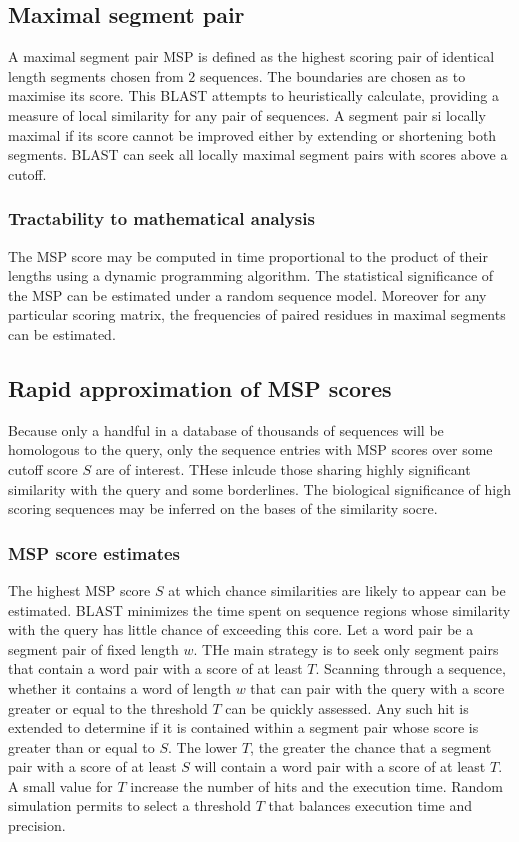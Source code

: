 		\subsection{Maximal segment pair}
		A maximal segment pair MSP is defined as the highest scoring pair of identical length segments chosen from $2$ sequences.
		The boundaries are chosen as to maximise its score.
		This BLAST attempts to heuristically calculate, providing a measure of local similarity for any pair of sequences.
		A segment pair si locally maximal if its score cannot be improved either by extending or shortening both segments.
		BLAST can seek all locally maximal segment pairs with scores above a cutoff.

		\subsubsection{Tractability to mathematical analysis}
		The MSP score may be computed in time proportional to the product of their lengths using a dynamic programming algorithm.
		The statistical significance of the MSP can be estimated under a random sequence model.
		Moreover for any particular scoring matrix, the frequencies of paired residues in maximal segments can be estimated.

	\subsection{Rapid approximation of MSP scores}
	Because only a handful in a database of thousands of sequences will be homologous to the query, only the sequence entries with MSP scores over some cutoff score $S$ are of interest.
	THese inlcude those sharing highly significant similarity with the query and some borderlines.
	The biological significance of high scoring sequences may be inferred on the bases of the similarity socre.

		\subsubsection{MSP score estimates}
		The highest MSP score $S$ at which chance similarities are likely to appear can be estimated.
		BLAST minimizes the time spent on sequence regions whose similarity with the query has little chance of exceeding this core.
		Let a word pair be a segment pair of fixed length $w$.
		THe main strategy is to seek only segment pairs that contain a word pair with a score of at least $T$.
		Scanning through a sequence, whether it contains a word of length $w$ that can pair with the query with a score greater or equal to the threshold $T$ can be quickly assessed.
		Any such hit is extended to determine if it is contained within a segment pair whose score is greater than or equal to $S$.
		The lower $T$, the greater the chance that a segment pair with a score of at least $S$ will contain a word pair with a score of at least $T$.
		A small value for $T$ increase the number of hits and the execution time.
		Random simulation permits to select a threshold $T$ that balances execution time and precision.

